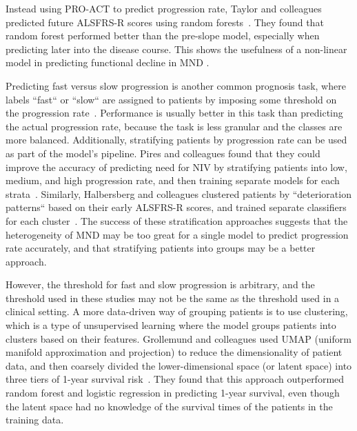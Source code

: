 
Instead using PRO-ACT to predict progression rate, Taylor and colleagues predicted future ALSFRS-R scores using random forests~\cite{taylorPredictingDiseaseProgression2016}.
They found that random forest performed better than the pre-slope model, especially when predicting later into the disease course.
This shows the usefulness of a non-linear model in predicting functional decline in MND .

Predicting fast versus slow progression is another common prognosis task, where labels ``fast`` or ``slow`` are assigned to patients by imposing some threshold on the progression rate~\cite{ongPredictingFunctionalDecline2017, dinabduljabbarPredictingAmyotrophicLateral2023}.
Performance is usually better in this task than predicting the actual progression rate, because the task is less granular and the classes are more balanced.
Additionally, stratifying patients by progression rate can be used as part of the model's pipeline.
Pires and colleagues found that they could improve the accuracy of predicting need for NIV by stratifying patients into low, medium, and high progression rate, and then training separate models for each strata~\cite{piresPredictingNoninvasiveVentilation2018}.
Similarly, Halbersberg and colleagues clustered patients by ``deterioration patterns`` based on their early ALSFRS-R scores, and trained separate classifiers for each cluster~\cite{halbersbergTemporalModelingDeterioration2019}.
The success of these stratification approaches suggests that the heterogeneity of MND may be too great for a single model to predict progression rate accurately, and that stratifying patients into groups may be a better approach.

However, the threshold for fast and slow progression is arbitrary, and the threshold used in these studies may not be the same as the threshold used in a clinical setting.
A more data-driven way of grouping patients is to use clustering, which is a type of unsupervised learning where the model groups patients into clusters based on their features.
Grollemund and colleagues used UMAP (uniform manifold approximation and projection) to reduce the dimensionality of patient data, and then coarsely divided the lower-dimensional space (or latent space) into three tiers of 1-year survival risk~\cite{grollemundDevelopmentValidation1year2020}.
They found that this approach outperformed random forest and logistic regression in predicting 1-year survival, even though the latent space had no knowledge of the survival times of the patients in the training data.

